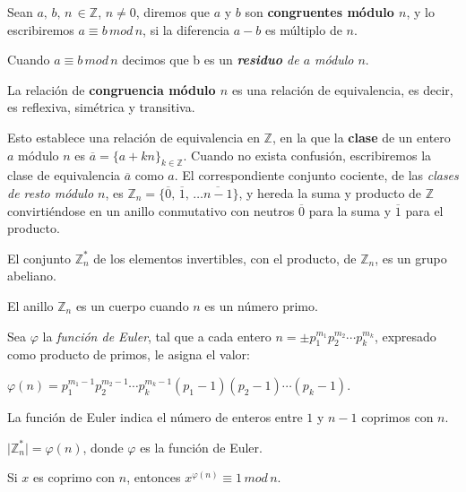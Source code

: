 \begin{definition}
	Sean $a,\,b,\,n\,\in \mathbb{Z}$, $n \neq 0$, diremos que $a$ y $b$ son \textbf{congruentes módulo $n$}, y lo escribiremos $a \equiv b \, mod \, n$, si la diferencia $a - b$ es múltiplo de $n$.
\end{definition}

Cuando $a \equiv b \, mod \, n$ decimos que b es un \textit{\textbf{residuo} de $a$ módulo $n$}.

\begin{proposition}
	La relación de \textbf{congruencia módulo $n$} es una relación de equivalencia, es decir, es reflexiva, simétrica y transitiva.
\end{proposition}

Esto establece una relación de equivalencia en $\mathbb{Z}$, en la que la \textbf{clase} de un entero $a$ módulo $n$ es $\overline{a} = \{ a + kn \}_{k \in \mathbb{Z}}$. Cuando no exista confusión, escribiremos la clase de equivalencia $\overline{a}$ como $a$.
El correspondiente conjunto cociente, de las \textit{clases de resto módulo $n$}, es $\mathbb{Z}_n = \{\overline{0},\,\overline{1},\,\dots\overline{n-1}\}$, y hereda la suma y producto de $\mathbb{Z}$ convirtiéndose en un anillo conmutativo con neutros $\overline{0}$ para la suma y $\overline{1}$ para el producto.

\begin{proposition}
	El conjunto $\mathbb{Z}_n^*$ de los elementos invertibles, con el producto, de $\mathbb{Z}_n$, es un grupo abeliano.
\end{proposition}


\begin{theorem}
	El anillo $\mathbb{Z}_n$ es un cuerpo cuando $n$ es un número primo.
\end{theorem}

Sea $\varphi$ la \textit{función de Euler}, tal que a cada entero $n=\pm p_1^{m_1}p_2^{m_2}\cdots p_k^{m_k}$, expresado como producto de primos, le asigna el valor:

$\varphi(n)=p_1^{m_1-1} p_2^{m_2-1} \cdots p_k^{m_k-1} (p_1 -1) (p_2 -1) \cdots (p_k -1)$.

La función de Euler indica el número de enteros entre $1$ y $n-1$ coprimos con $n$.

\begin{proposition}
	$\mid \mathbb{Z}^*_n \mid = \varphi(n)$, donde $\varphi$ es la función de Euler.
\end{proposition}

\begin{theorem}[Euler]
	Si $x$ es coprimo con $n$, entonces $x^{\varphi(n)} \equiv 1 \, mod \, n$.
\end{theorem}

